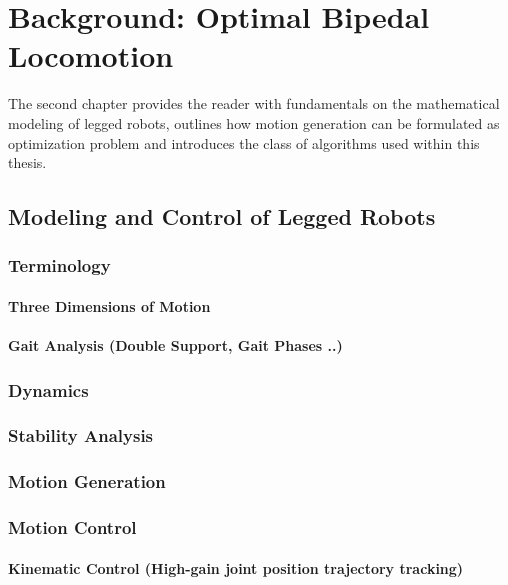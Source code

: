 
\chapter{Background: Optimal Bipedal Locomotion}\label{c2}
The second chapter provides the reader with fundamentals on the mathematical modeling of legged robots, outlines how motion generation can be formulated as optimization problem and introduces the class of algorithms used within this thesis. 

\section{Modeling and Control of Legged Robots}
\subsection{Terminology}
\subsubsection{Three Dimensions of Motion}
\subsubsection{Gait Analysis (Double Support, Gait Phases ..)}
\subsection{Dynamics}
\subsection{Stability Analysis}
\subsection{Motion Generation}
\subsection{Motion Control}
\subsubsection{Kinematic Control (High-gain joint position trajectory tracking)}
